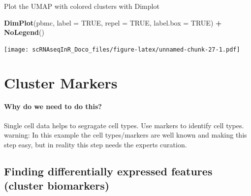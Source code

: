\documentclass[
]{book}
\newenvironment{Shaded}{\begin{snugshade}}{\end{snugshade}}
\newcommand{\AttributeTok}[1]{\textcolor[rgb]{0.13,0.29,0.53}{#1}}
\newcommand{\CommentTok}[1]{\textcolor[rgb]{0.56,0.35,0.01}{\textit{#1}}}
\newcommand{\ConstantTok}[1]{\textcolor[rgb]{0.56,0.35,0.01}{#1}}
\newcommand{\FloatTok}[1]{\textcolor[rgb]{0.00,0.00,0.81}{#1}}
\newcommand{\FunctionTok}[1]{\textcolor[rgb]{0.13,0.29,0.53}{\textbf{#1}}}
\newcommand{\NormalTok}[1]{#1}
\newcommand{\OtherTok}[1]{\textcolor[rgb]{0.56,0.35,0.01}{#1}}
\newcommand{\SpecialCharTok}[1]{\textcolor[rgb]{0.81,0.36,0.00}{\textbf{#1}}}
\begin{document}
\begin{Shaded}
\end{Shaded}

Plot the UMAP with colored clusters with Dimplot

\begin{Shaded}
\begin{Highlighting}[]
\FunctionTok{DimPlot}\NormalTok{(pbmc, }\AttributeTok{label =} \ConstantTok{TRUE}\NormalTok{, }\AttributeTok{repel =} \ConstantTok{TRUE}\NormalTok{, }\AttributeTok{label.box =} \ConstantTok{TRUE}\NormalTok{) }\SpecialCharTok{+} \FunctionTok{NoLegend}\NormalTok{()}
\end{Highlighting}
\end{Shaded}

\texttt{[image: scRNAseqInR\_Doco\_files/figure-latex/unnamed-chunk-27-1.pdf]}

\hypertarget{clustermarkers}{%
\chapter{Cluster Markers}\label{clustermarkers}}

\hypertarget{why-do-we-need-to-do-this-6}{%
\subsubsection*{Why do we need to do this?}\label{why-do-we-need-to-do-this-6}}

Single cell data helps to segragate cell types. Use markers to identify cell types. warning: In this example the cell types/markers are well known and making this step easy, but in reality this step needs the experts curation.

\hypertarget{section-10}{%
\subsubsection*{}\label{section-10}}

\hypertarget{finding-differentially-expressed-features-cluster-biomarkers}{%
\section{Finding differentially expressed features (cluster biomarkers)}\label{finding-differentially-expressed-features-cluster-biomarkers}}
\end{document}
